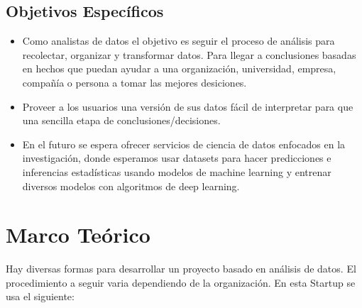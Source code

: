 \documentclass[12pt,a4paper,openright]{article}
\begin{document}
\subsection{Objetivos Específicos}
\begin{itemize}
    \item Como analistas de datos el objetivo es seguir el proceso de an\'alisis para recolectar, organizar y transformar datos. Para llegar a conclusiones basadas en hechos que puedan ayudar a una organizaci\'on, universidad, empresa, compañ\'ia o persona a tomar las mejores desiciones.
    \item Proveer a los usuarios una versi\'on de sus datos f\'acil de interpretar para que una sencilla etapa de conclusiones/decisiones.
    \item En el futuro se espera ofrecer servicios de ciencia de datos enfocados en la investigación, donde esperamos usar datasets para hacer predicciones e inferencias estad\'isticas usando modelos de machine learning y entrenar diversos modelos con algoritmos de deep learning.

\end{itemize}


\section{Marco Te\'orico}
Hay diversas formas para desarrollar un proyecto basado en an\'alisis de datos. El procedimiento a seguir varia dependiendo de la organizaci\'on. En esta Startup se usa el siguiente:
\end{document}

